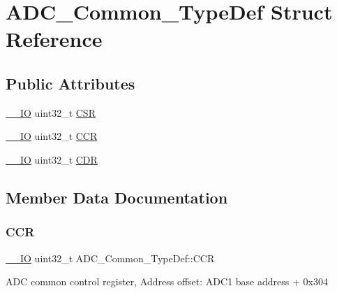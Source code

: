 \hypertarget{struct_a_d_c___common___type_def}{}\section{A\+D\+C\+\_\+\+Common\+\_\+\+Type\+Def Struct Reference}
\label{struct_a_d_c___common___type_def}
\subsection*{Public Attributes}
\begin{DoxyCompactItemize}
\item 
\mbox{\hyperlink{core__sc300_8h_aec43007d9998a0a0e01faede4133d6be}{\+\_\+\+\_\+\+IO}} uint32\+\_\+t \mbox{\hyperlink{struct_a_d_c___common___type_def_ac38e24f600f9e134a54a0c43b976a4f4}{C\+SR}}
\item 
\mbox{\hyperlink{core__sc300_8h_aec43007d9998a0a0e01faede4133d6be}{\+\_\+\+\_\+\+IO}} uint32\+\_\+t \mbox{\hyperlink{struct_a_d_c___common___type_def_aee6d4af7571a1bad2fec9e7b53733277}{C\+CR}}
\item 
\mbox{\hyperlink{core__sc300_8h_aec43007d9998a0a0e01faede4133d6be}{\+\_\+\+\_\+\+IO}} uint32\+\_\+t \mbox{\hyperlink{struct_a_d_c___common___type_def_a6f7399bf70f677ef5de46a3038f414e1}{C\+DR}}
\end{DoxyCompactItemize}


\subsection{Member Data Documentation}
\mbox{\label{struct_a_d_c___common___type_def_aee6d4af7571a1bad2fec9e7b53733277}} 
\subsubsection{\texorpdfstring{CCR}{CCR}}
{\footnotesize\ttfamily \mbox{\hyperlink{core__sc300_8h_aec43007d9998a0a0e01faede4133d6be}{\+\_\+\+\_\+\+IO}} uint32\+\_\+t A\+D\+C\+\_\+\+Common\+\_\+\+Type\+Def\+::\+C\+CR}

A\+DC common control register, Address offset\+: A\+D\+C1 base address + 0x304 \mbox{\label{struct_a_d_c___common___type_def_a6f7399bf70f677ef5de46a3038f414e1}} 
